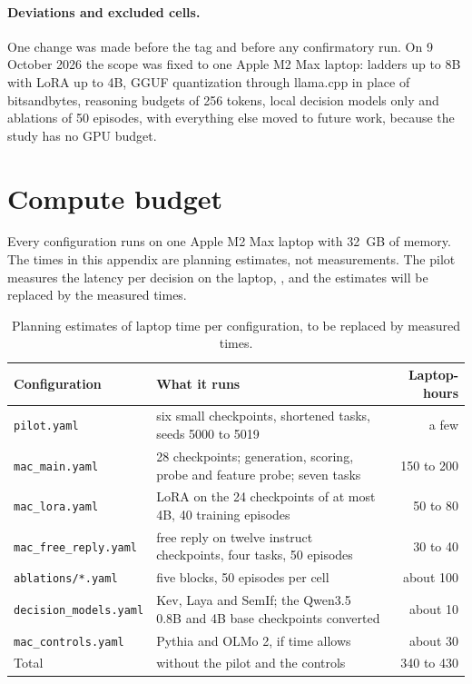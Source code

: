 \paragraph{Deviations and excluded cells.}
One change was made before the tag and before any confirmatory run. On 9 October 2026 the scope was fixed to one Apple M2 Max laptop: ladders up to 8B with LoRA up to 4B, GGUF quantization through llama.cpp in place of bitsandbytes, reasoning budgets of 256 tokens, local decision models only and ablations of 50 episodes, with everything else moved to future work, because the study has no GPU budget. 

\section{Compute budget}
\label{app:compute}

Every configuration runs on one Apple M2 Max laptop with 32~GB of memory. The times in this appendix are planning estimates, not measurements. The pilot measures the latency per decision on the laptop, , and the estimates will be replaced by the measured times. 

\begin{table}[h]
\centering\small
\caption{Planning estimates of laptop time per configuration, to be replaced by measured times.}
\label{tab:compute}
\begin{tabularx}{\linewidth}{@{}l X r@{}}
\toprule
Configuration & What it runs & Laptop-hours\\
\midrule
\texttt{pilot.yaml} & six small checkpoints, shortened tasks, seeds 5000 to 5019 & a few\\
\texttt{mac\_main.yaml} & 28 checkpoints; generation, scoring, probe and feature probe; seven tasks & 150 to 200\\
\texttt{mac\_lora.yaml} & LoRA on the 24 checkpoints of at most 4B, 40 training episodes & 50 to 80\\
\texttt{mac\_free\_reply.yaml} & free reply on twelve instruct checkpoints, four tasks, 50 episodes & 30 to 40\\
\texttt{ablations/*.yaml} & five blocks, 50 episodes per cell & about 100\\
\texttt{decision\_models.yaml} & Kev, Laya and SemIf; the Qwen3.5 0.8B and 4B base checkpoints converted & about 10\\
\texttt{mac\_controls.yaml} & Pythia and OLMo 2, if time allows & about 30\\
\midrule
Total & without the pilot and the controls & 340 to 430\\
\bottomrule
\end{tabularx}
\end{table}

